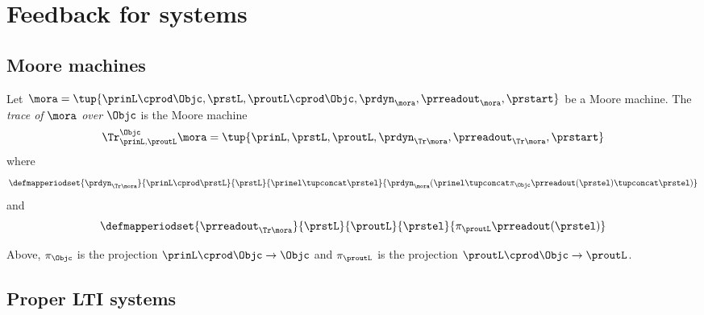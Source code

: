 
\section{Feedback for systems}
\label{sec:feedback-processes}



\subsection{Moore machines}



\begin{definition}
Let $\mora = \tup{\prinL \cprod \Objc,\prstL,\proutL \cprod \Objc,\prdyn_\mora,\prreadout_\mora,\prstart}$ be a Moore machine. The \emph{trace of} $\mora$ \emph{over} $\Objc$ is the Moore machine 
\begin{equation}
\Tr_{\prinL,\proutL}^\Objc \mora = \tup{\prinL,\prstL,\proutL, \prdyn_{\Tr \mora},  \prreadout_{\Tr \mora} ,\prstart}
\end{equation}
where 
\begin{equation}
  \defmapperiodset{
        \prdyn_{\Tr \mora}
    }{
        \prinL \cprod \prstL 
    }{
        \prstL 
    }{
        \prinel \tupconcat \prstel
    }{
        \prdyn_\mora(\prinel \tupconcat \pi_\Objc  \prreadout (\prstel) \tupconcat \prstel)
    }
\end{equation}
and 
\begin{equation}
  \defmapperiodset{
        \prreadout_{\Tr \mora}
    }{
        \prstL 
    }{
        \proutL 
    }{
        \prstel
    }{
        \pi_\proutL \prreadout (\prstel)
    }
\end{equation}

Above, $\pi_\Objc$ is the projection $\prinL \cprod \Objc \to \Objc$ and $\pi_\proutL$ is the projection $\proutL \cprod \Objc \to \proutL$.
\end{definition}


\subsection{Proper LTI systems}



